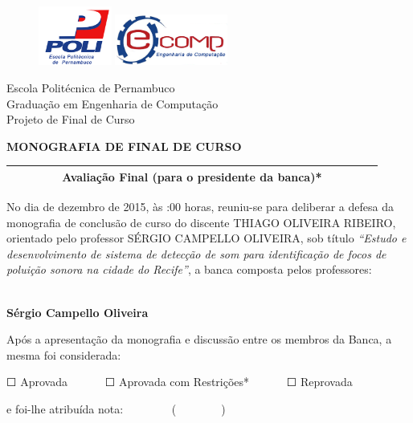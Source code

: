 \documentclass[12pt]{article}
\begin{document}
	\thispagestyle{empty}	\begin{figure}[!htp]
	    {\includegraphics[scale=0.2, width=2.4cm]{../imagens/poli.png}}\hfill%
	    {\includegraphics[scale=0.3, width=3.7cm]{../imagens/ecomp.png}}%
  	\end{figure}
  	
    \begin{flushleft}
        Escola Politécnica de Pernambuco\\
        Graduação em Engenharia de Computação\\
        Projeto de Final de Curso
    \end{flushleft}
    
	\begin{center}
		{\bf MONOGRAFIA DE FINAL DE CURSO}\\[0.2cm]
		\begin{center}
    		\begin{tabular}{|ccc|}
    		    \hline
    			\rowcolor[gray]{.9}
    			\ \ \ \ \ \ & {\bf Avaliação Final (para o presidente da banca)*} & \ \ \ \ \ \ \\
    			\hline
    		\end{tabular}
		\end{center}
	\end{center}
	\vspace{0.5cm}
	 No dia { de dezembro de 2015}, às {:00} horas, reuniu-se para deliberar a defesa da monografia de conclusão de curso do discente {\sf THIAGO OLIVEIRA RIBEIRO}, orientado pelo professor {\sf SÉRGIO CAMPELLO OLIVEIRA}, sob título {\it ``Estudo e desenvolvimento de sistema de detecção de som para identificação de focos de poluição sonora na cidade do Recife''}, a banca composta pelos professores:
	    \begin{flushleft}
	        \vspace{0.2cm}{\bf José Paulo G. de Oliveira}\\
	        {\bf Sérgio Campello Oliveira}\vspace{0.2cm}
	    \end{flushleft}
	    Após a apresentação da monografia e discussão entre os membros da Banca, a mesma foi considerada:
	    \begin{center}
	    $\Square$ Aprovada \ \ \ \ \ \  $\Square$ Aprovada com Restrições* \ \ \ \ \ \ $\Square$ Reprovada
	    \end{center}
	    e foi-lhe atribuída nota: \ \ \ \ \ \ \ \ (\ \ \ \ \ \ \ \ )\\
	    
\end{document}
